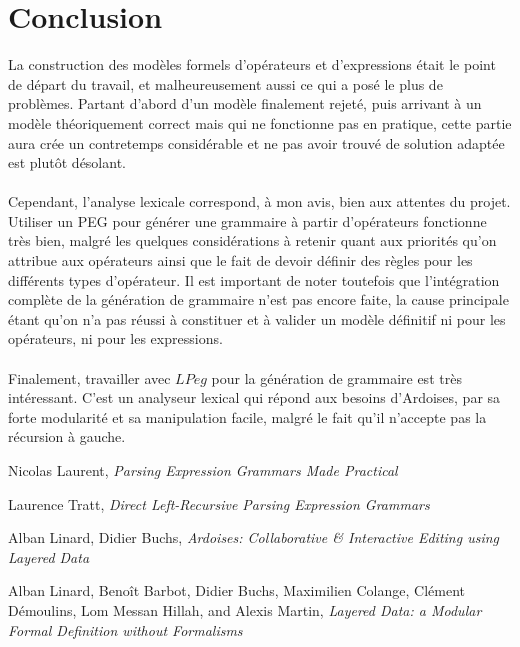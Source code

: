 \documentclass{article}
\begin{document}
\section{Conclusion}
La construction des modèles formels d'opérateurs et d'expressions était le point de départ du travail, et malheureusement aussi ce qui a posé le plus de problèmes. Partant d'abord d'un modèle finalement rejeté, puis arrivant à un modèle théoriquement correct mais qui ne fonctionne pas en pratique, cette partie aura crée un contretemps considérable et ne pas avoir trouvé de solution adaptée est plutôt désolant.
\ \\ \\
Cependant, l'analyse lexicale correspond, à mon avis, bien aux attentes du projet. Utiliser un PEG pour générer une grammaire à partir d'opérateurs fonctionne très bien, malgré les quelques considérations à retenir quant aux priorités qu'on attribue aux opérateurs ainsi que le fait de devoir définir des règles pour les différents types d'opérateur. Il est important de noter toutefois que l'intégration complète de la génération de grammaire n'est pas encore faite, la cause principale étant qu'on n'a pas réussi à constituer et à valider un modèle définitif ni pour les opérateurs, ni pour les expressions.
\ \\ \\
Finalement, travailler avec $LPeg$ pour la génération de grammaire est très intéressant. C'est un analyseur lexical qui répond aux besoins d'Ardoises, par sa forte modularité et sa manipulation facile, malgré le fait qu'il n'accepte pas la récursion à gauche.
\renewcommand\refname{Références}
\begin{thebibliography}{9}
	Nicolas Laurent,
	\emph{Parsing Expression Grammars Made Practical}
	
	Laurence Tratt,
	\emph{Direct Left-Recursive Parsing Expression Grammars}
	
	Alban Linard, Didier Buchs,
	\emph{Ardoises:	Collaborative \& Interactive Editing using Layered Data}
	
	Alban Linard, Benoît Barbot, Didier Buchs, Maximilien Colange,
	Clément Démoulins, Lom Messan Hillah, and Alexis Martin,
	\emph{Layered Data: a Modular Formal Definition	without Formalisms}
\end{thebibliography}
\end{document}
